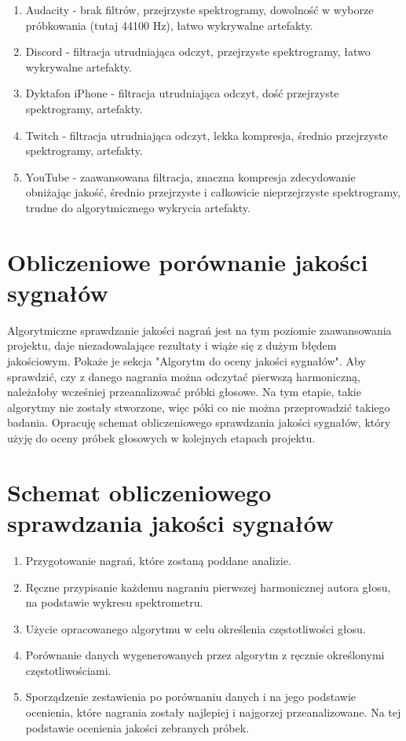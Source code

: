 \documentclass[a4paper,12pt]{extarticle}
\begin{document}
\begin{enumerate}
    \item Audacity - brak filtrów, przejrzyste spektrogramy, dowolność w wyborze próbkowania (tutaj 44100 Hz), łatwo wykrywalne artefakty.
    \item Discord - filtracja utrudniająca odczyt, przejrzyste spektrogramy, łatwo wykrywalne artefakty.
    \item Dyktafon iPhone - filtracja utrudniająca odczyt, dość przejrzyste spektrogramy, artefakty.
    \item Twitch - filtracja utrudniająca odczyt, lekka kompresja, średnio przejrzyste spektrogramy, artefakty.
    \item YouTube - zaawansowana filtracja, znaczna kompresja zdecydowanie obniżając jakość, średnio przejrzyste i całkowicie nieprzejrzyste spektrogramy, trudne do algorytmicznego wykrycia artefakty.
\end{enumerate}

\section*{Obliczeniowe porównanie jakości sygnałów}

Algorytmiczne sprawdzanie jakości nagrań jest na tym poziomie zaawansowania projektu, daje niezadowalające rezultaty i wiąże się z dużym błędem jakościowym. Pokaże je sekcja "Algorytm do oceny jakości sygnałów". Aby sprawdzić, czy z danego nagrania można odczytać pierwszą harmoniczną, należałoby wcześniej przeanalizować próbki głosowe. Na tym etapie, takie algorytmy nie zostały stworzone, więc póki co nie można przeprowadzić takiego badania. Opracuję schemat obliczeniowego sprawdzania jakości sygnałów, który użyję do oceny próbek głosowych w kolejnych etapach projektu.

\newpage

\section*{Schemat obliczeniowego sprawdzania jakości sygnałów}

\begin{enumerate}
    \item Przygotowanie nagrań, które zostaną poddane analizie.
    \item Ręczne przypisanie każdemu nagraniu pierwszej harmonicznej autora głosu, na podstawie wykresu spektrometru.
    \item Użycie opracowanego algorytmu w celu określenia częstotliwości głosu.
    \item Porównanie danych wygenerowanych przez algorytm z ręcznie określonymi częstotliwościami.
    \item Sporządzenie zestawienia po porównaniu danych i na jego podstawie ocenienia, które nagrania zostały najlepiej i najgorzej przeanalizowane. Na tej podstawie ocenienia jakości zebranych próbek.
\end{enumerate}
\end{document}

